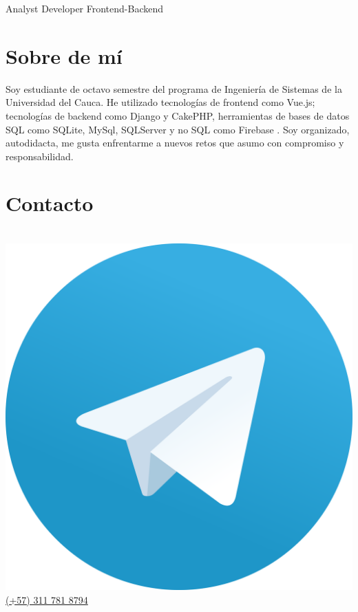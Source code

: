 \documentclass[american]{cv-class}
\begin{document}
{Analyst Developer Frontend-Backend}

\vspace{1.15cm}



\begin{aside}


    \vspace{3.2cm}
    
    \section{Sobre de mí}
    \justifying
    \begin{small}
    	{ Soy estudiante de octavo semestre del programa de Ingeniería de Sistemas de la
     Universidad del Cauca. He utilizado tecnologías de frontend como Vue.js; tecnologías de backend como Django y CakePHP, herramientas de bases de datos SQL como SQLite, MySql, SQLServer y no SQL como Firebase . Soy organizado, autodidacta, me gusta enfrentarme a nuevos retos que asumo con compromiso y responsabilidad.
    	}
    \end{small}

    
	\section{Contacto}
	\\
	\href{https://msng.link/o/?dawish7=tg}{\raisebox{-0.35ex}
	{\includegraphics[scale=0.0023]{img/telegram-logo.png}} (+57) 311 781 8794}
    

\end{aside}
\end{document}
